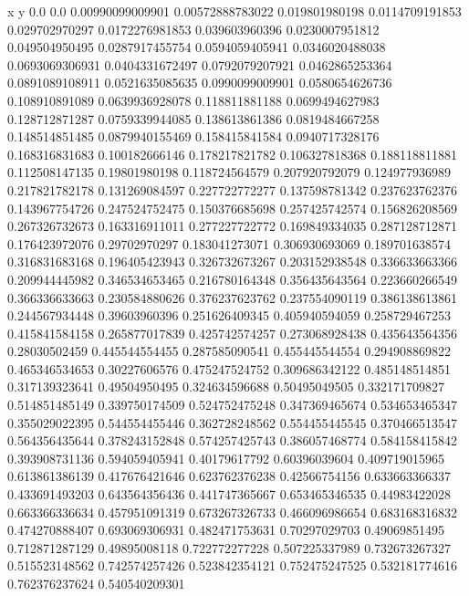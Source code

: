               x                y
            0.0              0.0
0.00990099009901  0.00572888783022
 0.019801980198  0.0114709191853
 0.029702970297  0.0172276981853
 0.039603960396  0.0230007951812
 0.049504950495  0.0287917455754
0.0594059405941  0.0346020488038
0.0693069306931  0.0404331672497
0.0792079207921  0.0462865253364
0.0891089108911  0.0521635085635
0.0990099009901  0.0580654626736
 0.108910891089  0.0639936928078
 0.118811881188  0.0699494627983
 0.128712871287  0.0759339944085
 0.138613861386  0.0819484667258
 0.148514851485  0.0879940155469
 0.158415841584  0.0940717328176
 0.168316831683   0.100182666146
 0.178217821782   0.106327818368
 0.188118811881   0.112508147135
  0.19801980198   0.118724564579
 0.207920792079   0.124977936989
 0.217821782178   0.131269084597
 0.227722772277   0.137598781342
 0.237623762376   0.143967754726
 0.247524752475   0.150376685698
 0.257425742574   0.156826208569
 0.267326732673   0.163316911011
 0.277227722772   0.169849334035
 0.287128712871   0.176423972076
  0.29702970297   0.183041273071
 0.306930693069   0.189701638574
 0.316831683168   0.196405423943
 0.326732673267   0.203152938548
 0.336633663366   0.209944445982
 0.346534653465   0.216780164348
 0.356435643564   0.223660266549
 0.366336633663   0.230584880626
 0.376237623762   0.237554090119
 0.386138613861   0.244567934448
  0.39603960396   0.251626409345
 0.405940594059   0.258729467253
 0.415841584158   0.265877017839
 0.425742574257   0.273068928438
 0.435643564356    0.28030502459
 0.445544554455   0.287585090541
 0.455445544554   0.294908869822
 0.465346534653    0.30227606576
 0.475247524752   0.309686342122
 0.485148514851   0.317139323641
  0.49504950495   0.324634596688
  0.50495049505   0.332171709827
 0.514851485149   0.339750174509
 0.524752475248   0.347369465674
 0.534653465347   0.355029022395
 0.544554455446   0.362728248562
 0.554455445545   0.370466513547
 0.564356435644   0.378243152848
 0.574257425743   0.386057468774
 0.584158415842   0.393908731136
 0.594059405941    0.40179617792
  0.60396039604   0.409719015965
 0.613861386139   0.417676421646
 0.623762376238    0.42566754156
 0.633663366337   0.433691493203
 0.643564356436   0.441747365667
 0.653465346535    0.44983422028
 0.663366336634   0.457951091319
 0.673267326733   0.466096986654
 0.683168316832   0.474270888407
 0.693069306931   0.482471753631
  0.70297029703    0.49069851495
 0.712871287129    0.49895008118
 0.722772277228   0.507225337989
 0.732673267327   0.515523148562
 0.742574257426   0.523842354121
 0.752475247525   0.532181774616
 0.762376237624   0.540540209301
